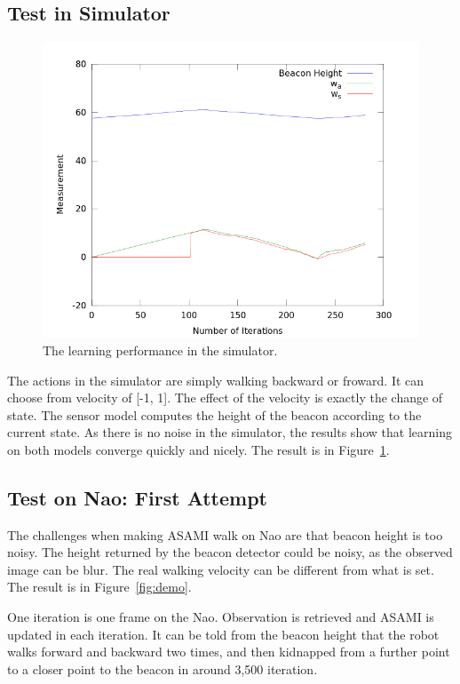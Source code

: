 \documentclass[10pt]{article}
\begin{document}
\subsection{Test in Simulator}

\begin{figure}[h]
\centering
\includegraphics[width=0.7\columnwidth]{simResult.png}
\caption{The learning performance in the simulator.}
\label{fig:sim}
\end{figure}

The actions in the simulator are simply walking backward or froward.
It can choose from velocity of [-1, 1]. The effect of the velocity is
exactly the change of state.
The sensor model computes the height of the beacon according to the
current state. As there is no noise in the simulator, the results show
that learning on both models converge quickly and nicely. The result
is in Figure~\ref{fig:sim}.

\subsection{Test on Nao: First Attempt}

The challenges when making ASAMI walk on Nao are that beacon height is
too noisy. The height returned by the beacon detector could be noisy,
as the observed image can be blur. The real walking velocity can be
different from what is set. The result is in Figure~\ref{fig:demo}.

One iteration is one frame on the Nao. Observation is retrieved and
ASAMI is updated in each iteration. It can be told from the beacon
height that the robot walks forward and backward two times, and then
kidnapped from a further point to a closer point to the beacon in
around 3,500 iteration.
\end{document}
